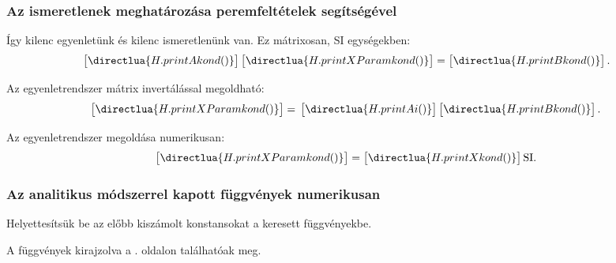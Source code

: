 \subsubsection{Az ismeretlenek meghatározása peremfeltételek segítségével}



Így kilenc egyenletünk és kilenc ismeretlenünk van. Ez mátrixosan,
SI egységekben:
\scriptsize
\begin{equation}
  \bgroup
  \sifigures{2}
  \sisci{}
  \begin{bmatrix}
    \directlua{H.printAkond()}
  \end{bmatrix}
  \egroup
  \begin{bmatrix}
    \directlua{H.printXParamkond()}
  \end{bmatrix}
  =
  \siplaces{3}
  \begin{bmatrix}
    \directlua{H.printBkond()}
  \end{bmatrix}
  \text.
  \label{eq:alma}
\end{equation}
\normalsize

Az egyenletrendszer mátrix invertálással megoldható:
\scriptsize
\begin{equation}
  \begin{bmatrix}
    \directlua{H.printXParamkond()}
  \end{bmatrix}
  =
  \bgroup
  \sifigures{2}
  \sisci{}
  \begin{bmatrix}
    \directlua{H.printAi()}
  \end{bmatrix}
  \egroup
  \siplaces{3}
  \begin{bmatrix}
    \directlua{H.printBkond()}
  \end{bmatrix}
  \label{eq:alma-inverted}
  \text.
\end{equation}
\normalsize

Az egyenletrendszer megoldása numerikusan:
\begin{equation}
  \begin{bmatrix}
    \directlua{H.printXParamkond()}
  \end{bmatrix}
  =
  \sifigures{6}
  \begin{bmatrix}
    \directlua{H.printXkond()}
  \end{bmatrix}
  \mathrm{SI}
  \text.
  \label{eq:alma-sol}
\end{equation}

\subsubsection{Az analitikus módszerrel kapott függvények numerikusan}

Helyettesítsük be az előbb kiszámolt konstansokat a keresett függvényekbe.




% 

A függvények kirajzolva a \pageref{fig:plot-v}. oldalon találhatóak meg.
